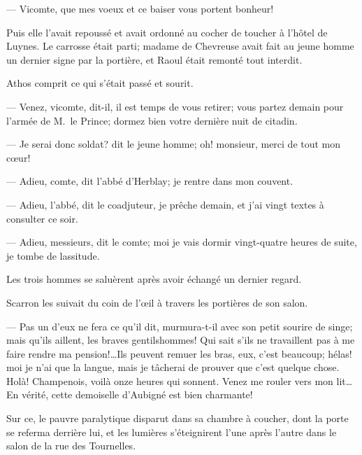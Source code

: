— Vicomte, que mes voeux et ce baiser vous portent bonheur!

Puis elle l'avait repoussé et avait ordonné au cocher de toucher à l'hôtel de Luynes. Le carrosse était parti; madame de Chevreuse avait fait au jeune homme un dernier signe par la portière, et Raoul était remonté tout interdit.

Athos comprit ce qui s'était passé et sourit.

— Venez, vicomte, dit-il, il est temps de vous retirer; vous partez demain pour l'armée de M.~le Prince; dormez bien votre dernière nuit de citadin.

— Je serai donc soldat? dit le jeune homme; oh! monsieur, merci de tout mon cœur!

— Adieu, comte, dit l'abbé d'Herblay; je rentre dans mon couvent.

— Adieu, l'abbé, dit le coadjuteur, je prêche demain, et j'ai vingt textes à consulter ce soir.

— Adieu, messieurs, dit le comte; moi je vais dormir vingt-quatre heures de suite, je tombe de lassitude.

Les trois hommes se saluèrent après avoir échangé un dernier regard.

Scarron les suivait du coin de l'œil à travers les portières de son salon.

— Pas un d'eux ne fera ce qu'il dit, murmura-t-il avec son petit sourire de singe; mais qu'ils aillent, les braves gentilshommes! Qui sait s'ils ne travaillent pas à me faire rendre ma pension!\dots Ils peuvent remuer les bras, eux, c'est beaucoup; hélas! moi je n'ai que la langue, mais je tâcherai de prouver que c'est quelque chose. Holà! Champenois, voilà onze heures qui sonnent. Venez me rouler vers mon lit\dots En vérité, cette demoiselle d'Aubigné est bien charmante!

Sur ce, le pauvre paralytique disparut dans sa chambre à coucher, dont la porte se referma derrière lui, et les lumières s'éteignirent l'une après l'autre dans le salon de la rue des Tournelles.